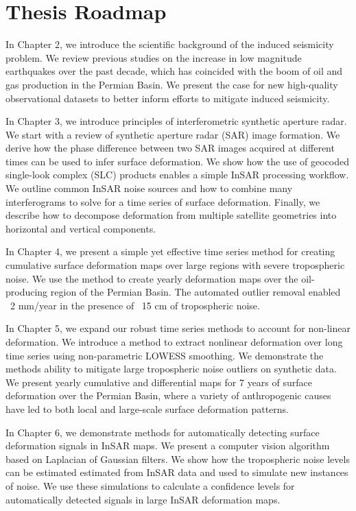 \documentclass{utexasthesis}
\begin{document}
\section{Thesis Roadmap}
\label{sec:chap1-roadmap}

In Chapter 2, we introduce the scientific background of the induced seismicity problem. We review previous studies on the increase in low magnitude earthquakes over the past decade, which has coincided with the boom of oil and gas production in the Permian Basin. We present the case for new high-quality observational datasets to better inform efforts to mitigate induced seismicity.

In Chapter 3, we introduce principles of interferometric synthetic aperture radar. We start with a review of synthetic aperture radar (SAR) image formation. We derive how the phase difference between two SAR images acquired at different times can be used to infer surface deformation. We show how the use of geocoded single-look complex (SLC) products enables a simple InSAR processing workflow. We outline common InSAR noise sources and how to combine many interferograms to solve for a time series of surface deformation. Finally, we describe how to decompose deformation from multiple satellite geometries into horizontal and vertical components.


In Chapter 4, we present a simple yet effective time series method for creating cumulative surface deformation maps over large regions with severe tropospheric noise. We use the method to create yearly deformation maps over the oil-producing region of the Permian Basin. The automated outlier removal enabled ~2 mm/year in the presence of ~15 cm of tropospheric noise.


In Chapter 5, we expand our robust time series methods to account for non-linear deformation. We introduce a method to extract nonlinear deformation over long time series using non-parametric LOWESS smoothing. We demonstrate the methods ability to mitigate large tropospheric noise outliers on synthetic data. We present yearly cumulative and differential maps for 7 years of surface deformation over the Permian Basin, where a variety of anthropogenic causes have led to both local and large-scale surface deformation patterns.


In Chapter 6, we demonstrate methods for automatically detecting surface deformation signals in InSAR maps. We present a computer vision algorithm based on Laplacian of Gaussian filters. We show how the tropospheric noise levels can be estimated estimated from InSAR data and used to simulate new instances of noise. We use these simulations to calculate a confidence levels for automatically detected signals in large InSAR deformation maps.
\end{document}
